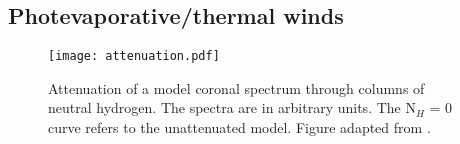 \documentclass{rsos}
\begin{document}

\subsection{Photevaporative/thermal winds}

\begin{figure}[b]
\centering
\texttt{[image: attenuation.pdf]}
\caption{Attenuation of a model coronal spectrum through columns of neutral hydrogen. The spectra are in arbitrary units. The N$_H$ = 0 curve refers to the unattenuated model. Figure adapted from \cite{2009ApJ...699.1639E}. }\label{fig:attenuation}
\end{figure}
\end{document}
